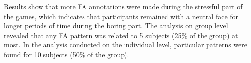 Results show that more FA annotations were made during the stressful part of the games, which indicates that participants remained with a neutral face for longer periods of time during the boring part. The analysis on group level revealed that any FA pattern was related to 5 subjects (25\% of the group) at most. In the analysis conducted on the individual level, particular patterns were found for 10 subjects (50\% of the group).

